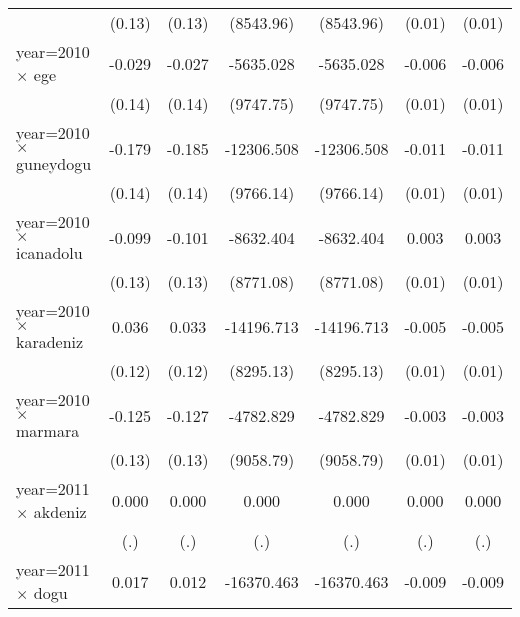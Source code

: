 {\begin{tabular}{l*{6}{c}}
                    &      (0.13)         &      (0.13)         &   (8543.96)         &   (8543.96)         &      (0.01)         &      (0.01)         \\
year=2010 $\times$ ege&      -0.029         &      -0.027         &   -5635.028         &   -5635.028         &      -0.006         &      -0.006         \\
                    &      (0.14)         &      (0.14)         &   (9747.75)         &   (9747.75)         &      (0.01)         &      (0.01)         \\
year=2010 $\times$ guneydogu&      -0.179         &      -0.185         &  -12306.508         &  -12306.508         &      -0.011         &      -0.011         \\
                    &      (0.14)         &      (0.14)         &   (9766.14)         &   (9766.14)         &      (0.01)         &      (0.01)         \\
year=2010 $\times$ icanadolu&      -0.099         &      -0.101         &   -8632.404         &   -8632.404         &       0.003         &       0.003         \\
                    &      (0.13)         &      (0.13)         &   (8771.08)         &   (8771.08)         &      (0.01)         &      (0.01)         \\
year=2010 $\times$ karadeniz&       0.036         &       0.033         &  -14196.713         &  -14196.713         &      -0.005         &      -0.005         \\
                    &      (0.12)         &      (0.12)         &   (8295.13)         &   (8295.13)         &      (0.01)         &      (0.01)         \\
year=2010 $\times$ marmara&      -0.125         &      -0.127         &   -4782.829         &   -4782.829         &      -0.003         &      -0.003         \\
                    &      (0.13)         &      (0.13)         &   (9058.79)         &   (9058.79)         &      (0.01)         &      (0.01)         \\
year=2011 $\times$ akdeniz&       0.000         &       0.000         &       0.000         &       0.000         &       0.000         &       0.000         \\
                    &         (.)         &         (.)         &         (.)         &         (.)         &         (.)         &         (.)         \\
year=2011 $\times$ dogu&       0.017         &       0.012         &  -16370.463         &  -16370.463         &      -0.009         &      -0.009         \\

\end{tabular}}
